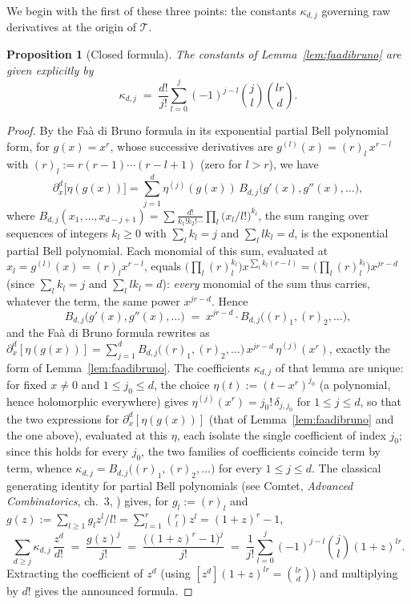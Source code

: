 \documentclass[10pt,a4paper]{amsart}
\newtheorem{proposition}[theorem]{Proposition}
\begin{document}
We begin with the first of these three points: the constants $\kappa_{d,j}$ governing raw derivatives at the origin of $\mathcal T$.

\begin{proposition}[Closed formula]\label{prop:kappa-closed}
The constants of Lemma~\ref{lem:faadibruno} are given explicitly by
\[
\kappa_{d,j} \;=\; \frac{d!}{j!}\sum_{l=0}^{j}(-1)^{j-l}\binom{j}{l}\binom{lr}{d}.
\]
\end{proposition}

\begin{proof}
By the Faà di Bruno formula in its exponential partial Bell polynomial form, for $g(x)=x^r$, whose successive derivatives are $g^{(l)}(x)=(r)_l\,x^{r-l}$ with $(r)_l:=r(r-1)\cdots(r-l+1)$ (zero for $l>r$), we have
\[
\partial_x^d\big[\eta(g(x))\big] = \sum_{j=1}^d \eta^{(j)}(g(x))\,B_{d,j}\big(g'(x),g''(x),\dots\big),
\]
where $B_{d,j}(x_1,\dots,x_{d-j+1})=\sum \frac{d!}{k_1!k_2!\cdots}\prod_l\big(x_l/l!\big)^{k_l}$, the sum ranging over sequences of integers $k_l\ge0$ with $\sum_lk_l=j$ and $\sum_llk_l=d$, is the exponential partial Bell polynomial. Each monomial of this sum, evaluated at $x_l=g^{(l)}(x)=(r)_lx^{r-l}$, equals $\big(\prod_l(r)_l^{k_l}\big)x^{\sum_lk_l(r-l)}=\big(\prod_l(r)_l^{k_l}\big)x^{jr-d}$ (since $\sum_lk_l=j$ and $\sum_llk_l=d$): \emph{every} monomial of the sum thus carries, whatever the term, the same power $x^{jr-d}$. Hence
\[
B_{d,j}\big(g'(x),g''(x),\dots\big) \;=\; x^{jr-d}\cdot B_{d,j}\big((r)_1,(r)_2,\dots\big),
\]
and the Faà di Bruno formula rewrites as $\partial_x^d[\eta(g(x))]=\sum_{j=1}^d B_{d,j}\big((r)_1,(r)_2,\dots\big)\,x^{jr-d}\,\eta^{(j)}(x^r)$, exactly the form of Lemma~\ref{lem:faadibruno}. The coefficients $\kappa_{d,j}$ of that lemma are unique: for fixed $x\ne0$ and $1\le j_0\le d$, the choice $\eta(t):=(t-x^r)^{j_0}$ (a polynomial, hence holomorphic everywhere) gives $\eta^{(j)}(x^r)=j_0!\,\delta_{j,j_0}$ for $1\le j\le d$, so that the two expressions for $\partial_x^d[\eta(g(x))]$ (that of Lemma~\ref{lem:faadibruno} and the one above), evaluated at this $\eta$, each isolate the single coefficient of index $j_0$; since this holds for every $j_0$, the two families of coefficients coincide term by term, whence $\kappa_{d,j}=B_{d,j}\big((r)_1,(r)_2,\dots\big)$ for every $1\le j\le d$. The classical generating identity for partial Bell polynomials (see Comtet, \emph{Advanced Combinatorics}, ch.~3, \cite{Comtet}) gives, for $g_l:=(r)_l$ and $g(z):=\sum_{l\ge1}g_l z^l/l! = \sum_{l=1}^r\binom{r}{l}z^l = (1+z)^r-1$,
\[
\sum_{d\ge j}\kappa_{d,j}\,\frac{z^d}{d!} \;=\; \frac{g(z)^j}{j!} \;=\; \frac{\big((1+z)^r-1\big)^j}{j!} \;=\; \frac{1}{j!}\sum_{l=0}^j(-1)^{j-l}\binom{j}{l}(1+z)^{lr}.
\]
Extracting the coefficient of $z^d$ (using $[z^d](1+z)^{lr}=\binom{lr}{d}$) and multiplying by $d!$ gives the announced formula.
\end{proof}
\end{document}
